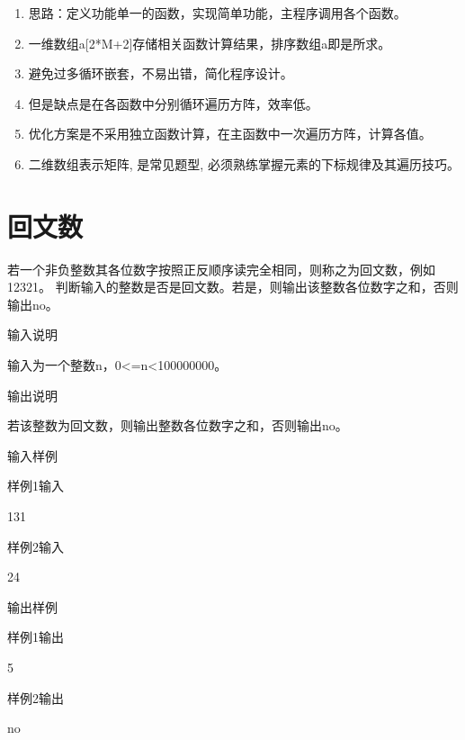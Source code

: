 \begin{note}[要点]
	\begin{enumerate}
		\item 思路：定义功能单一的函数，实现简单功能，主程序调用各个函数。
		\item 一维数组a[2*M+2]存储相关函数计算结果，排序数组a即是所求。 
		\item 避免过多循环嵌套，不易出错，简化程序设计。 
		\item 但是缺点是在各函数中分别循环遍历方阵，效率低。
		\item 优化方案是不采用独立函数计算，在主函数中一次遍历方阵，计算各值。 
		\item 二维数组表示矩阵, 是常见题型, 必须熟练掌握元素的下标规律及其遍历技巧。
	\end{enumerate}
\end{note}

\section{回文数}
若一个非负整数其各位数字按照正反顺序读完全相同，则称之为回文数，例如12321。
判断输入的整数是否是回文数。若是，则输出该整数各位数字之和，否则输出no。

输入说明	

输入为一个整数n，0<=n<100000000。

输出说明	

若该整数为回文数，则输出整数各位数字之和，否则输出no。

输入样例
	
样例1输入

131

样例2输入

24

输出样例

样例1输出
	
5

样例2输出

no

